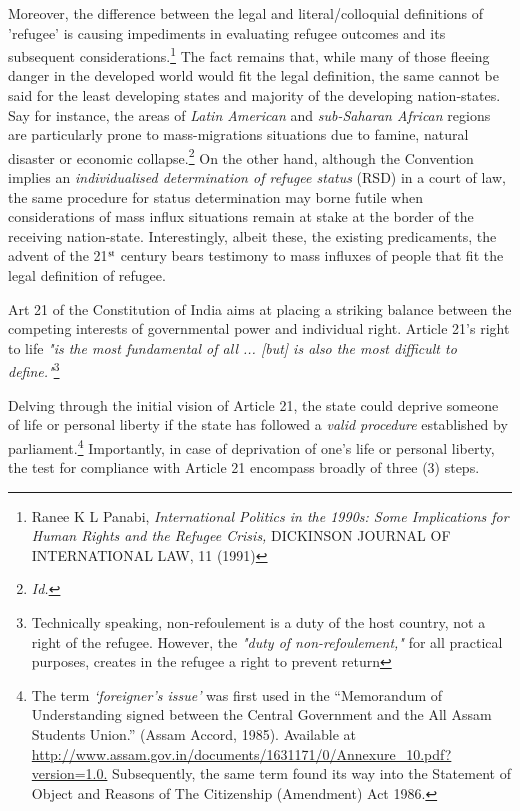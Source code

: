 \begin{multicols}{2}
\noi
Moreover, the difference between the legal and literal/colloquial definitions of 'refugee' is
causing impediments in evaluating refugee outcomes and its subsequent considerations.\footnote{Ranee K L Panabi, \textit{International Politics in the 1990s: Some Implications for Human Rights and the Refugee Crisis,} DICKINSON JOURNAL OF INTERNATIONAL LAW, 11 (1991)} The fact remains that, while many of those fleeing danger in the developed world would fit the legal definition, the same cannot be said for the least developing states and majority of the
developing nation-states. Say for instance, the areas of \textit{Latin American} and \textit{sub-Saharan
African} regions are particularly prone to mass-migrations situations due to famine, natural
disaster or economic collapse.\footnote{\textit{Id.}} On the other hand, although the Convention implies an
\textit{individualised determination of refugee status} (RSD) in a court of law, the same procedure for
status determination may borne futile when considerations of mass influx situations remain at
stake at the border of the receiving nation-state. Interestingly, albeit these, the existing
predicaments, the advent of the 21$^{\rm st}$ century bears testimony to mass influxes of people that
fit the legal definition of refugee.


\noi
Art 21 of the Constitution of India aims at placing a striking balance between the competing
interests of governmental power and individual right. Article 21's right to life \textit{"is the most
fundamental of all ... [but] is also the most difficult to define."}\footnote{Technically speaking, non-refoulement is a duty of the host country, not a right of the refugee. However, the \textit{"duty of non-refoulement,"} for all practical purposes, creates in the refugee a right to prevent return}

\noi
Delving through the initial vision of Article 21, the state could deprive someone of life or
personal liberty if the state has followed a \textit{valid procedure} established by
parliament.\footnote{The term \textit{‘foreigner’s issue’} was first used in the “Memorandum of Understanding signed between the Central Government and the All Assam Students Union.” (Assam Accord, 1985). Available at\\ \url{http://www.assam.gov.in/documents/1631171/0/Annexure_10.pdf?version=1.0.} Subsequently, the same term
found its way into the Statement of Object and Reasons of The Citizenship (Amendment) Act 1986.} Importantly, in case of deprivation of one's life or personal liberty, the test for
compliance with Article 21 encompass broadly of three (3) steps.


\end{multicols}
